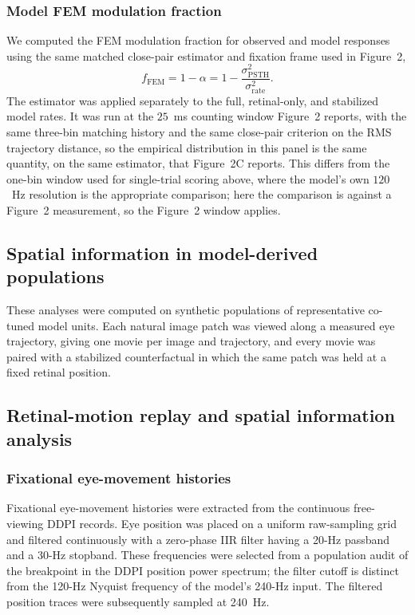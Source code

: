 \documentclass{lite}
\begin{document}
\subsubsection{Model FEM modulation fraction}
We computed the FEM modulation fraction for observed and model responses using the same matched close-pair estimator and fixation frame used in Figure~2,
\begin{equation}
f_{\mathrm{FEM}}
=
1-\alpha
=
1-\frac{\sigma^2_{\mathrm{PSTH}}}{\sigma^2_{\mathrm{rate}}}.
\end{equation}
The estimator was applied separately to the full, retinal-only, and stabilized model rates. It was run at the $25$~ms counting window Figure~2 reports, with the same three-bin matching history and the same close-pair criterion on the RMS trajectory distance, so the empirical distribution in this panel is the same quantity, on the same estimator, that Figure~2C reports. This differs from the one-bin window used for single-trial scoring above, where the model's own $120$~Hz resolution is the appropriate comparison; here the comparison is against a Figure~2 measurement, so the Figure~2 window applies.

\subsection{Spatial information in model-derived populations}
These analyses were computed on synthetic populations of representative co-tuned model units. Each natural image patch was viewed along a measured eye trajectory, giving one movie per image and trajectory, and every movie was paired with a stabilized counterfactual in which the same patch was held at a fixed retinal position.

\subsection{Retinal-motion replay and spatial information analysis}

\subsubsection{Fixational eye-movement histories}

Fixational eye-movement histories were extracted from the continuous free-viewing DDPI records. Eye position was placed on a uniform raw-sampling grid and filtered continuously with a zero-phase IIR filter having a 20-Hz passband and a 30-Hz stopband. These frequencies were selected from a population audit of the breakpoint in the DDPI position power spectrum; the filter cutoff is distinct from the 120-Hz Nyquist frequency of the model's 240-Hz input. The filtered position traces were subsequently sampled at 240~Hz.
\end{document}
